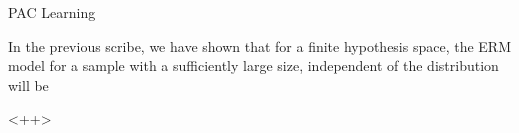 \documentclass{article}
\begin{document}
\makeheader%

\begin{ssection}{PAC Learning}

	In the previous scribe, we have shown that for a finite hypothesis space, the ERM model for a sample with a sufficiently large size, independent of the distribution will be 

\end{ssection}<++>
\end{document}
